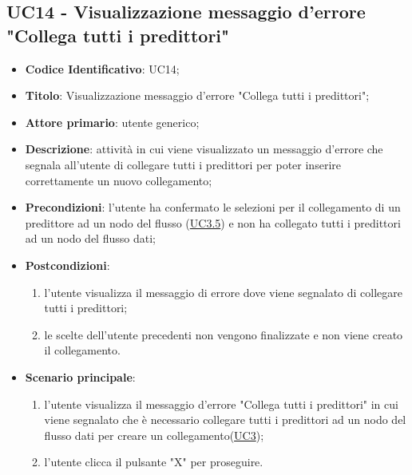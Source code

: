 

\label{par:UC14}
	\subsection{UC14 - Visualizzazione messaggio d'errore "Collega tutti i predittori"}
		\begin{itemize}
			\item\textbf{Codice Identificativo}: UC14;
			\item\textbf{Titolo}: Visualizzazione messaggio d'errore "Collega tutti i predittori";
			\item\textbf{Attore primario}: utente generico;
			\item\textbf{Descrizione}: attività in cui viene visualizzato un messaggio d'errore che segnala all'utente di collegare tutti i predittori per poter inserire correttamente un nuovo collegamento;
			\item\textbf{Precondizioni}: l'utente ha confermato le selezioni per il collegamento di un predittore ad un nodo del flusso (\hyperref[par:UC3.5]{UC3.5}) e non ha collegato tutti i predittori ad un nodo del flusso dati;
			\item\textbf{Postcondizioni}: 
				\begin{enumerate}
					\item l'utente visualizza il messaggio di errore dove viene segnalato di collegare tutti i predittori;
					\item le scelte dell'utente precedenti non vengono finalizzate e non viene creato il collegamento.
				\end{enumerate}		
			\item\textbf{Scenario principale}:
				\begin{enumerate}
					\item l'utente visualizza il messaggio d'errore "Collega tutti i predittori" in cui viene segnalato che è necessario collegare tutti i predittori ad un nodo del flusso dati per creare un collegamento(\hyperref[par:UC3]{UC3});
					\item l'utente clicca il pulsante "X" per proseguire.		
				\end{enumerate}		
		\end{itemize}


		\label{par:UC15}
